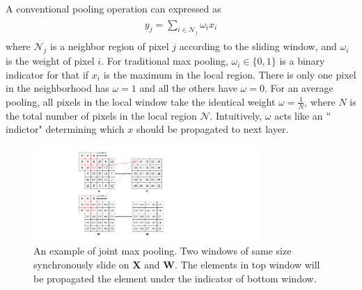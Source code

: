 A conventional pooling operation can expressed as
\begin{eqnarray}\label{pooling}
\begin{aligned}
y_{j} = \sum_{i\in \mathcal{N}_{j}} \omega_{i}x_{i}
\end{aligned}
\end{eqnarray}
where $\mathcal{N}_{j}$ is a neighbor region of pixel $j$ according to the sliding window, and $\omega_{i}$ is the weight of pixel $i$.
For traditional max pooling, $\omega_i \in \{0,1\}$ is a binary indicator for that if $x_i$ is the maximum in the local region.
There is only one pixel in the neighborhood has $\omega=1$ and all the others have $\omega=0$.
For an average pooling, all pixels in the local window take the identical weight $\omega=\frac{1}{N}$, where $N$ is the total number of pixels in the local region $\mathcal{N}$.
Intuitively, $\omega$ acts like an $``$indictor" determining which $x$ should be propagated to next layer.

\begin{figure}
    \begin{center}
        \includegraphics[width=3.4in]{figures/FigJMP.pdf}
    \end{center}
    \caption{An example of joint max pooling.
        Two windows of same size synchronously slide on $\mathbf{X}$ and $\mathbf{W}$.
       The elements in top window will be propagated the element under the indicator of bottom window.}
    \label{FigJMP}
\end{figure}


